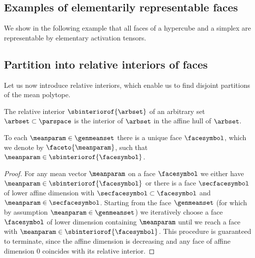 \subsection{Examples of elementarily representable faces}

We show in the following example that all faces of a hypercube and a simplex are representable by elementary activation tensors.





\subsection{Partition into relative interiors of faces}

Let us now introduce relative interiors, which enable us to find disjoint partitions of the mean polytope.

\begin{definition}
    \label{def:relativeInterior}
    The relative interior $\sbinteriorof{\arbset}$ of an arbitrary set $\arbset\subset\parspace$ is the interior of $\arbset$ in the affine hull of $\arbset$. %
\end{definition}

\begin{lemma}
    \label{lem:faceToMean}
    To each $\meanparam\in\genmeanset$ there is a unique face $\facesymbol$, which we denote by $\faceto{\meanparam}$, such that $\meanparam\in\sbinteriorof{\facesymbol}$.
\end{lemma}
\begin{proof}
    For any mean vector $\meanparam$ on a face $\facesymbol$ we either have $\meanparam\in\sbinteriorof{\facesymbol}$ or there is a face $\secfacesymbol$ of lower affine dimension with $\secfacesymbol\subset\facesymbol$ and $\meanparam\in\secfacesymbol$.
    Starting from the face $\genmeanset$ (for which by assumption $\meanparam\in\genmeanset$) we iteratively choose a face $\facesymbol$ of lower dimension containing $\meanparam$ until we reach a face with $\meanparam\in\sbinteriorof{\facesymbol}$.
    This procedure is guaranteed to terminate, since the affine dimension is decreasing and any face of affine dimension $0$ coincides with its relative interior.
\end{proof}


